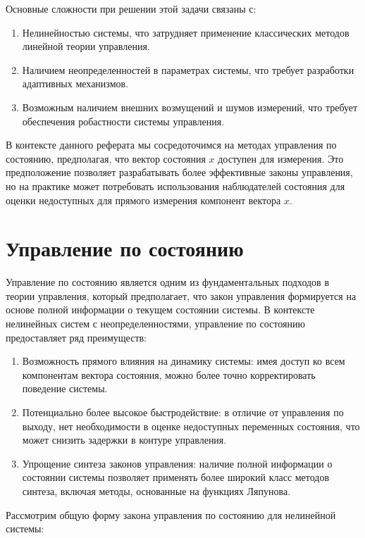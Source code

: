 \documentclass[a4paper,14pt]{extarticle} %
\begin{document}
Основные сложности при решении этой задачи связаны с:

\begin{enumerate}
    \item Нелинейностью системы, что затрудняет применение классических методов линейной теории управления.
    \item Наличием неопределенностей в параметрах системы, что требует разработки адаптивных механизмов.
    \item Возможным наличием внешних возмущений и шумов измерений, что требует обеспечения робастности системы управления.
\end{enumerate}

В контексте данного реферата мы сосредоточимся на методах управления по состоянию, предполагая, что вектор состояния $x$ доступен для измерения. Это предположение позволяет разрабатывать более эффективные законы управления, но на практике может потребовать использования наблюдателей состояния для оценки недоступных для прямого измерения компонент вектора $x$.

\section{Управление по состоянию}

Управление по состоянию является одним из фундаментальных подходов в теории управления, который предполагает, что закон управления формируется на основе полной информации о текущем состоянии системы. В контексте нелинейных систем с неопределенностями, управление по состоянию предоставляет ряд преимуществ:

\begin{enumerate}
    \item Возможность прямого влияния на динамику системы: имея доступ ко всем компонентам вектора состояния, можно более точно корректировать поведение системы.
    \item Потенциально более высокое быстродействие: в отличие от управления по выходу, нет необходимости в оценке недоступных переменных состояния, что может снизить задержки в контуре управления.
    \item Упрощение синтеза законов управления: наличие полной информации о состоянии системы позволяет применять более широкий класс методов синтеза, включая методы, основанные на функциях Ляпунова.
\end{enumerate}

Рассмотрим общую форму закона управления по состоянию для нелинейной системы:
\end{document}
